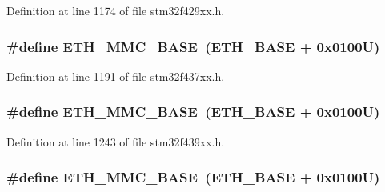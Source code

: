 Definition at line 1174 of file stm32f429xx.\+h.

\subsubsection[{\texorpdfstring{E\+T\+H\+\_\+\+M\+M\+C\+\_\+\+B\+A\+SE}{ETH_MMC_BASE}}]{\setlength{\rightskip}{0pt plus 5cm}\#define E\+T\+H\+\_\+\+M\+M\+C\+\_\+\+B\+A\+SE~({\bf E\+T\+H\+\_\+\+B\+A\+SE} + 0x0100\+U)}\hypertarget{group___peripheral__memory__map_ga4946f2b3b03f7998343ac1778fbcf725}{}\label{group___peripheral__memory__map_ga4946f2b3b03f7998343ac1778fbcf725}


Definition at line 1191 of file stm32f437xx.\+h.

\subsubsection[{\texorpdfstring{E\+T\+H\+\_\+\+M\+M\+C\+\_\+\+B\+A\+SE}{ETH_MMC_BASE}}]{\setlength{\rightskip}{0pt plus 5cm}\#define E\+T\+H\+\_\+\+M\+M\+C\+\_\+\+B\+A\+SE~({\bf E\+T\+H\+\_\+\+B\+A\+SE} + 0x0100\+U)}\hypertarget{group___peripheral__memory__map_ga4946f2b3b03f7998343ac1778fbcf725}{}\label{group___peripheral__memory__map_ga4946f2b3b03f7998343ac1778fbcf725}


Definition at line 1243 of file stm32f439xx.\+h.

\subsubsection[{\texorpdfstring{E\+T\+H\+\_\+\+M\+M\+C\+\_\+\+B\+A\+SE}{ETH_MMC_BASE}}]{\setlength{\rightskip}{0pt plus 5cm}\#define E\+T\+H\+\_\+\+M\+M\+C\+\_\+\+B\+A\+SE~({\bf E\+T\+H\+\_\+\+B\+A\+SE} + 0x0100\+U)}\hypertarget{group___peripheral__memory__map_ga4946f2b3b03f7998343ac1778fbcf725}{}\label{group___peripheral__memory__map_ga4946f2b3b03f7998343ac1778fbcf725}


